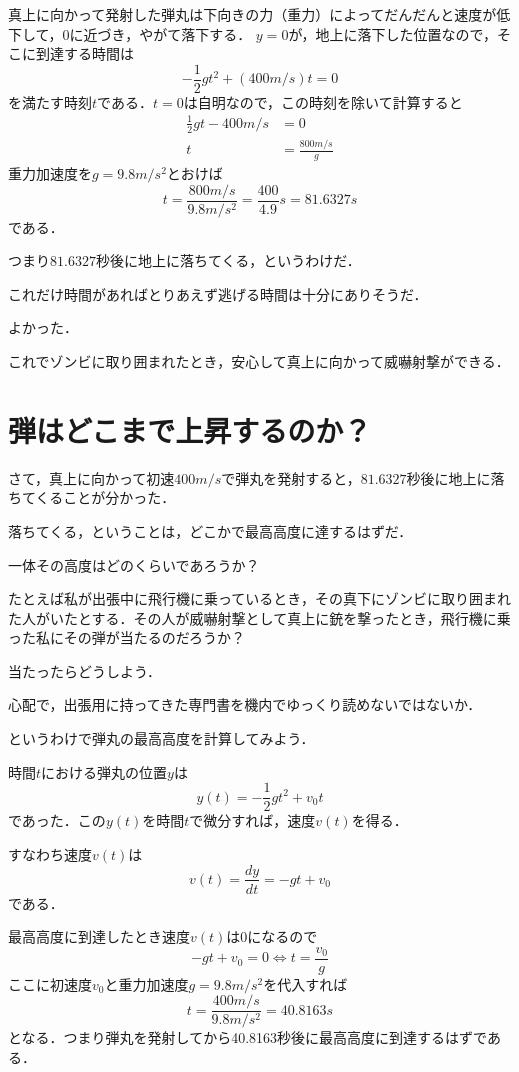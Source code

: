 \documentclass[a4paper,12pt]{jarticle}
\theoremstyle{definition}%
\begin{document}
真上に向かって発射した弾丸は下向きの力（重力）によってだんだんと速度が低下して，0に近づき，やがて落下する．
$y=0$が，地上に落下した位置なので，そこに到達する時間は
\[ 
-\frac{1}{2}g t^2+ (400m/s)t=0
\]
を満たす時刻$t$である．$t=0$は自明なので，この時刻を除いて計算すると
\begin{align*} 
\frac{1}{2}gt-400m/s& = 0\\
t&=\frac{800m/s}{g}
\end{align*}
重力加速度を$g=9.8m/s^2$とおけば
\[ 
t=\frac{800m/s}{9.8m/s^2}=\frac{400}{4.9}s=81.6327s
\]
である．

つまり$81.6327$秒後に地上に落ちてくる，というわけだ．

これだけ時間があればとりあえず逃げる時間は十分にありそうだ．


よかった．


これでゾンビに取り囲まれたとき，安心して真上に向かって威嚇射撃ができる．


\section{弾はどこまで上昇するのか？}


さて，真上に向かって初速$400m/s$で弾丸を発射すると，$81.6327$秒後に地上に落ちてくることが分かった．

落ちてくる，ということは，どこかで最高高度に達するはずだ．

一体その高度はどのくらいであろうか？

たとえば私が出張中に飛行機に乗っているとき，その真下にゾンビに取り囲まれた人がいたとする．その人が威嚇射撃として真上に銃を撃ったとき，飛行機に乗った私にその弾が当たるのだろうか？

当たったらどうしよう．

心配で，出張用に持ってきた専門書を機内でゆっくり読めないではないか．

というわけで弾丸の最高高度を計算してみよう．

時間$t$における弾丸の位置$y$は
\[ 
y(t)=-\frac{1}{2}gt^2+v_0 t
\]
であった．この$y(t)$を時間$t$で微分すれば，速度$v(t)$を得る．

すなわち速度$v(t)$は
\[ 
v(t)=\frac{dy}{dt}=-gt+v_0
\]
である．

最高高度に到達したとき速度$v(t)$は0になるので
\[ 
-gt+v_0=0 \iff t=\frac{v_0}{g} 
\]
ここに初速度$v_0$と重力加速度$g=9.8m/s^2$を代入すれば
\[ 
t=\frac{400m/s}{9.8m/s^2}=40.8163s
\]
となる．つまり弾丸を発射してから40.8163秒後に最高高度に到達するはずである．
\end{document}
